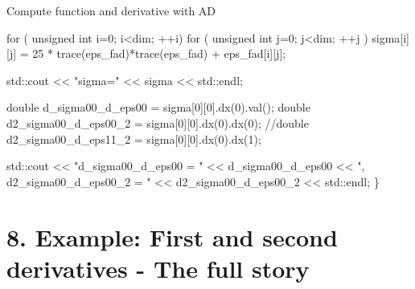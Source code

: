  Compute function and derivative with AD 
\begin{DoxyCode}
    \textcolor{keywordflow}{for} ( \textcolor{keywordtype}{unsigned} \textcolor{keywordtype}{int} i=0; i<dim; ++i)
        \textcolor{keywordflow}{for} ( \textcolor{keywordtype}{unsigned} \textcolor{keywordtype}{int} j=0; j<dim; ++j )
            sigma[i][j] = 25 * trace(eps\_fad)*trace(eps\_fad) + eps\_fad[i][j];
 
    std::cout << \textcolor{stringliteral}{"sigma="} << sigma << std::endl;
 
    \textcolor{keywordtype}{double} d\_sigma00\_d\_eps00 = sigma[0][0].dx(0).val();
    \textcolor{keywordtype}{double} d2\_sigma00\_d\_eps00\_2 = sigma[0][0].dx(0).dx(0);
    \textcolor{comment}{//double d2\_sigma00\_d\_eps11\_2 = sigma[0][0].dx(0).dx(1);}
 
    std::cout << \textcolor{stringliteral}{"d\_sigma00\_d\_eps00 = "} << d\_sigma00\_d\_eps00 << \textcolor{stringliteral}{", d2\_sigma00\_d\_eps00\_2 = "} << 
      d2\_sigma00\_d\_eps00\_2 << std::endl;
\}
\end{DoxyCode}
 \hypertarget{index_Ex8}{}\section{8. Example\+: First and second derivatives -\/ The full story}\label{index_Ex8}

